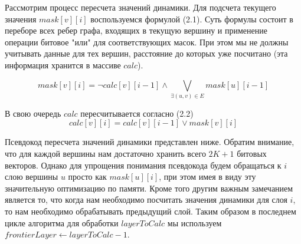  Рассмотрим процесс пересчета значений динамики. Для подсчета текущего значения $mask[v][i]$ воспользуемся формулой (2.1). Суть формулы состоит в переборе всех ребер графа, входящих в текущую вершину и применение операции битовое "или" для соответствующих масок. При этом мы не должны учитывать данные для тех вершин, расстояние до которых уже посчитано (эта информация хранится в массиве $calc$).  
  

\FloatBarrier
\begin{equation}
mask[v][i] = \neg calc[v][i - 1] \wedge \bigvee_{\exists (u, v) \in E} mask[u][i - 1] 
\end{equation}
\FloatBarrier

В свою очередь $calc$ пересчитывается согласно (2.2)
\FloatBarrier
\begin{equation}
calc[v][i] = calc[v][i - 1] \vee mask[v][i]
\end{equation}
\FloatBarrier

Псевдокод пересчета значений динамики представлен ниже. Обратим внимание, что для каждой вершины нам достаточно хранить всего $2K + 1$ битовых векторов. Однако для упрощения понимания псевдокода будем обращаться к $i$ слою вершины $u$ просто как $mask[u][i]$, при этом имея в виду эту значительную оптимизацию по памяти. Кроме того другим важным замечанием является то, что когда нам необходимо посчитать значения динамики для слоя $i$, то нам необходимо обрабатывать предыдущий слой. Таким образом в последнем цикле алгоритма для обработки $layerToCalc$ мы используем $frontierLayer \gets layerToCalc - 1$.

